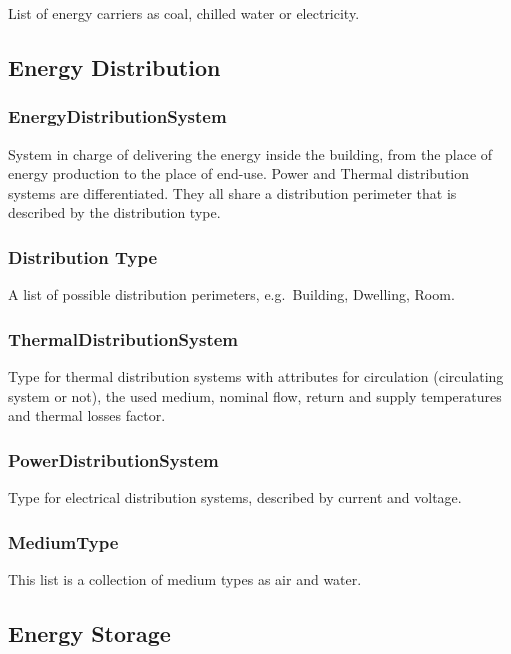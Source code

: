 \documentclass[a4paper,12pt]{article}
\begin{document}
List of energy carriers as coal, chilled water or electricity.

\subsection{Energy Distribution}\label{energy-distribution}

\subsubsection{EnergyDistributionSystem}\label{energydistributionsystem}

System in charge of delivering the energy inside the building, from the
place of energy production to the place of end-use. Power and Thermal
distribution systems are differentiated. They all share a distribution
perimeter that is described by the distribution type.

\subsubsection{Distribution Type}\label{distribution-type}

A list of possible distribution perimeters, e.g.~Building, Dwelling,
Room.

\subsubsection{ThermalDistributionSystem}\label{thermaldistributionsystem}

Type for thermal distribution systems with attributes for circulation
(circulating system or not), the used medium, nominal flow, return and
supply temperatures and thermal losses factor.

\subsubsection{PowerDistributionSystem}\label{powerdistributionsystem}

Type for electrical distribution systems, described by current and
voltage.

\subsubsection{MediumType}\label{mediumtype}

This list is a collection of medium types as air and water.

\subsection{Energy Storage}\label{energy-storage}
\end{document}
